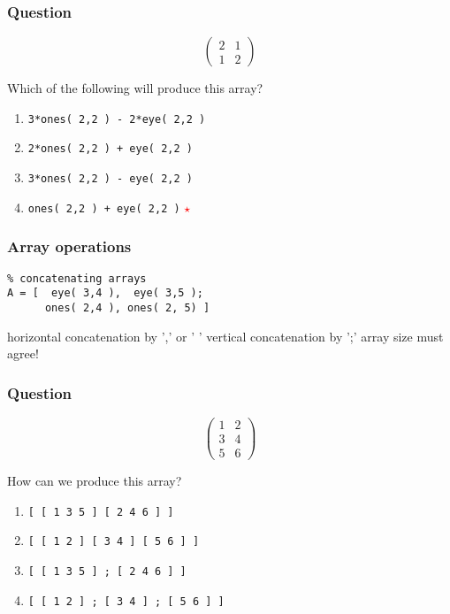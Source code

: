 \documentclass[11pt]{beamer}
\newcommand{\correctstar}{{\Large\textcolor{red}{$\star$}}}
\begin{document}
\begin{frame}[fragile]
  \frametitle{Question}
  \Enlarge
$$
\left(
\begin{array}{cc}
2 & 1 \\
1 & 2
\end{array}
\right)
$$

Which of the following will produce this array?

  \begin{enumerate}[label=\Alph*]
    \item  \texttt{3*ones( 2,2 ) - 2*eye( 2,2 )}
    \item  \texttt{2*ones( 2,2 ) + eye( 2,2 )}
    \item  \texttt{3*ones( 2,2 ) - eye( 2,2 )}
    \item  \texttt{ones( 2,2 ) + eye( 2,2 )}  \correctstar
  \end{enumerate}
\end{frame}

\begin{frame}[fragile]
  \frametitle{Array operations}
  \Enlarge

  \begin{Verbatim}
% concatenating arrays
A = [  eye( 3,4 ),  eye( 3,5 );
      ones( 2,4 ), ones( 2, 5) ]
  \end{Verbatim}
  \begin{enumerate} \pause
  \myitem horizontal concatenation by ',' or ' '
  \myitem vertical concatenation by  ';'
  \myitem array size must agree!
  \end{enumerate}
\end{frame}

\begin{frame}[fragile]
  \frametitle{Question}
  \Enlarge
$$
\left(
\begin{array}{cc}
1 & 2 \\
3 & 4 \\
5 & 6
\end{array}
\right)
$$

How can we produce this array?

  \begin{enumerate}[label=\Alph*]
    \item  \texttt{[ [ 1 3 5 ] [ 2 4 6 ] ]}
    \item  \texttt{[ [ 1 2 ] [ 3 4 ] [ 5 6 ] ]}
    \item  \texttt{[ [ 1 3 5 ] ; [ 2 4 6 ] ]}
    \item  \texttt{[ [ 1 2 ] ; [ 3 4 ] ; [ 5 6 ] ]}
  \end{enumerate}
\end{frame}
\end{document}
